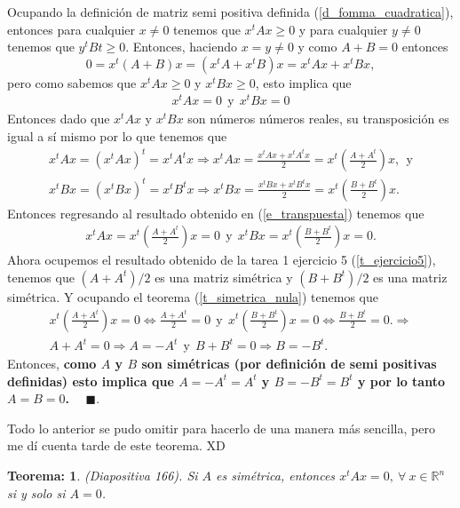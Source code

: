 \documentclass[11pt,letterpaper]{article}
\newcommand{\mR}{\mathbb{R}}
\newcommand{\fin}{$\blacksquare.$}
\newtheorem{thmt}{Teorema:}
\begin{document}
\begin{enumerate}
Ocupando la definición de matriz semi positiva definida (\ref{d_fomma_cuadratica}), entonces para cualquier $x\neq 0$ tenemos que $x^tAx\geq 0 $ y para cualquier $y\neq 0$ tenemos que $y^tBt\geq 0$. Entonces, haciendo $x=y\neq 0$ y como $A+B=0$ entonces 
$$0=x^t(A+B)x=(x^tA+x^tB)x=x^tAx+x^tBx,$$
pero como sabemos que $x^tAx\geq 0$ y $x^tBx\geq 0$, esto implica que 
\begin{align}\label{e_transpuesta}
x^tAx= 0\ \ \text{y} \ \ x^tBx= 0
\end{align}
Entonces dado que $x^tAx$  y $x^tBx$ son números números reales, su transposición es igual a sí mismo por lo que tenemos que 
\begin{align*}
x^tAx=(x^tAx)^t=x^tA^tx\Rightarrow x^tAx=\frac{x^tAx+x^tA^tx}{2} = x^t\left( \frac{A+A^t}{2}\right) x, \ \ \text{y}\\
x^tBx=(x^tBx)^t=x^tB^tx\Rightarrow x^tBx=\frac{x^tBx+x^tB^tx}{2} = x^t\left( \frac{B+B^t}{2}\right) x.
\end{align*}
Entonces regresando al resultado obtenido en (\ref{e_transpuesta}) tenemos que 
\begin{align*}
x^tAx = x^t\left( \frac{A+A^t}{2}\right) x = 0 \ \ \text{y} \ \ x^tBx=x^t\left( \frac{B+B^t}{2}\right) x = 0.
\end{align*}
Ahora ocupemos el resultado obtenido de la tarea 1 ejercicio 5 (\ref{t_ejercicio5}), tenemos que $(A+A^t)/2$ es una matriz simétrica y $(B+B^t)/2$ es una matriz simétrica. Y ocupando el teorema (\ref{t_simetrica_nula}) tenemos que 
\begin{align*}
 x^t\left( \frac{A+A^t}{2}\right) x = 0 \Leftrightarrow \frac{A+A^t}{2}=0 \ \ \text{y} \ \ x^t\left( \frac{B+B^t}{2}\right) x = 0 \Leftrightarrow \frac{B+B^t}{2} =0.\Rightarrow\\
A+A^t=0\Rightarrow A=-A^t \ \ \text{y} \ \ B+B^t=0\Rightarrow B=-B^t.
\end{align*}
Entonces, \textbf{como $A$ y $B$ son simétricas (por definición de semi positivas definidas) esto implica que $A=-A^t=A^t$ y $B=-B^t=B^t$ y por lo tanto $A=B=0$.} \ \ \fin

Todo lo anterior se pudo omitir para hacerlo de una manera más sencilla, pero me dí cuenta tarde de este teorema. XD
\begin{framed}
\begin{thmt} \label{t_inversa}
	(Diapositiva 166). Si $A$ es simétrica, entonces $x^tAx=0,\ \forall \ x\in \mR^n$ si y solo si $A=0$. 
	    \end{thmt}
\end{framed}



\end{enumerate}
\end{document}
